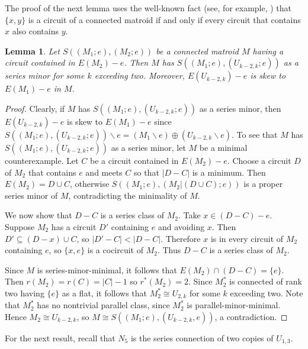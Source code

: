 \documentclass[12pt,reqno]{amsart}
\newtheorem{lemma}[theorem]{Lemma}
\theoremstyle{definition}
\theoremstyle{remark}
\numberwithin{equation}{section}
\newcommand{\del}{\backslash}
\begin{document}
The proof of the next lemma uses the well-known fact (see, for example, \cite[Exercise 2.1.7]{ox}) that $\{x,y\}$ is a circuit of a connected matroid if and only if every circuit that contains $x$ also contains $y$.

\begin{lemma}\label{singlecct}
    Let $S((M_1;e),(M_2;e))$ be a connected matroid $M$ having a circuit contained in $E(M_2)-e$. Then $M$ has $S((M_1;e),(U_{k-2,k};e))$ as a series minor for some $k$ exceeding two. Moreover, $E(U_{k-2,k})-e$ is skew to $E(M_1)-e$ in $M$. 
\end{lemma}

\begin{proof}
    Clearly, if $M$ has $S((M_1;e),(U_{k-2,k};e))$ as a series minor, then $E(U_{k-2,k})-e$ is skew to $E(M_1)-e$ since $S((M_1;e),(U_{k-2,k};e))\del e=(M_1\del e)\oplus (U_{k-2,k}\del e)$.  
    To see that $M$ has $S((M_1;e),(U_{k-2,k};e))$ as a series minor, let $M$ be a minimal counterexample.
    Let $C$ be a circuit contained in $E(M_2)-e$.
    Choose a circuit $D$ of $M_2$ that contains $e$ and meets $C$ so that $|D-C|$ is a minimum. 
    Then $E(M_2)=D\cup C$, otherwise $S((M_1;e),(M_2|(D\cup C);e))$ is a proper series minor of $M$, contradicting the minimality of  $M$.  
    
    We now show that $D-C$ is a series class of $M_2$. 
    Take $x\in (D-C)-e$. Suppose $M_2$ has a circuit $D'$ containing $e$ and avoiding $x$. 
    Then $D'\subseteq (D-x)\cup C$, so $|D'-C|<|D-C|$.
    Therefore $x$ is in every circuit of $M_2$ containing $e$, so $\{x,e\}$ is a cocircuit of $M_2$. 
    Thus $D-C$ is a series class of $M_2$. 

Since $M$ is series-minor-minimal, it follows that $E(M_2)\cap (D-C)=\{e\}$. 
Then $r(M_2)=r(C)=|C|-1$ so $r^*(M_2)=2$. 
Since $M_2^*$ is connected of rank two having $\{e\}$ as a flat, it follows that $M_2^*\cong U_{2,k}$ for some $k$ exceeding two.
Note that $M_2^*$ has no nontrivial parallel class, since $M_2^*$ is parallel-minor-minimal. 
Hence $M_2\cong U_{k-2,k}$, so $M\cong S((M_1;e),(U_{k-2,k},e))$, a contradiction.   
\end{proof}


For the next result, recall that $N_5$ is the series connection of two copies of $U_{1,3}$. 
\end{document}
